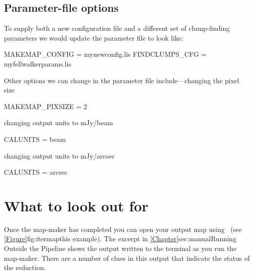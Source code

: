 \subsection{Parameter-file options}

To supply both a new configuration file and a different set of
clump-finding parameters we would update the parameter file
 to look like:

\begin{terminalv}
MAKEMAP_CONFIG = mynewconfig.lis
FINDCLUMPS_CFG = myfellwalkerparams.lis
\end{terminalv}

Other options we can change in the parameter file include---changing the pixel size

\begin{terminalv}
MAKEMAP_PIXSIZE = 2
\end{terminalv}

changing output units to mJy/beam

\begin{terminalv}
CALUNITS = beam
\end{terminalv}

changing output units to mJy/arcsec

\begin{terminalv}
CALUNITS = arcsec
\end{terminalv}



\section{What to look out for}
\flushbottom

Once the map-maker has completed you can open your output map using
\gaia\ (see \cref{Figure}{fig:itermap}{this example}). The excerpt in
\cref{Chapter}{sec:manual}{Running  Outside the Pipeline} shows the
output written to the terminal as you run the map-maker. There are a
number of clues in this output that indicate the status of the
reduction.


